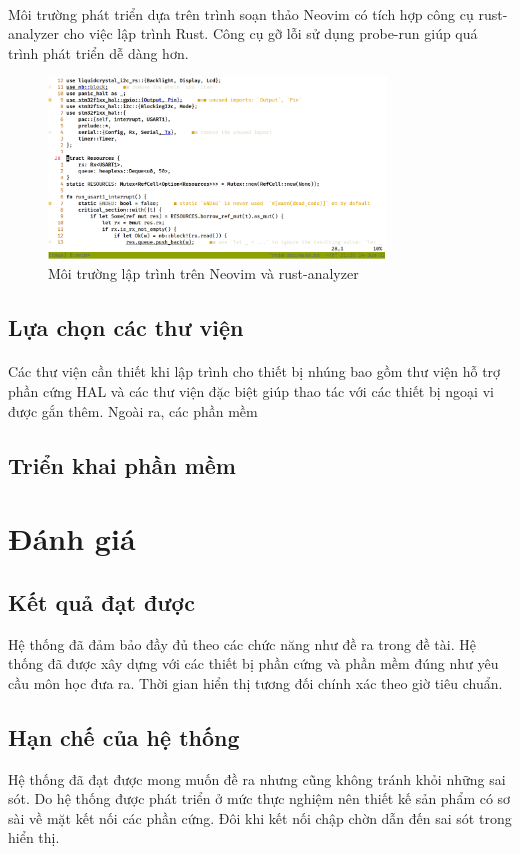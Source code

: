 \paragraph{}
Môi trường phát triển dựa trên trình soạn thảo Neovim có tích hợp công cụ rust-analyzer cho việc lập trình Rust. Công cụ gỡ lỗi sử dụng probe-run giúp quá trình phát triển dễ dàng hơn.
\begin{figure}[H]
    \centering
    \includegraphics[width=0.8\textwidth]{images/Screenshot from 2023-06-14 21-28-38.png}
    \caption{Môi trường lập trình trên Neovim và rust-analyzer}
    \label{fig:neovim-environment}
\end{figure}


\subsection{Lựa chọn các thư viện}
\paragraph{}
Các thư viện cần thiết khi lập trình cho thiết bị nhúng bao gồm thư viện hỗ trợ phần cứng HAL và các thư viện đặc biệt giúp thao tác với các thiết bị ngoại vi được gắn thêm. Ngoài ra, các phần mềm 
\subsection{Triển khai phần mềm}

\section{Đánh giá}

\subsection{Kết quả đạt được}
Hệ thống đã đảm bảo đầy đủ theo các chức năng như đề ra trong đề tài. Hệ thống đã được xây dựng với các thiết bị phần cứng và phần mềm đúng như yêu cầu môn học đưa ra.
Thời gian hiển thị tương đối chính xác theo giờ tiêu chuẩn.

\subsection{Hạn chế của hệ thống}
Hệ thống đã đạt được mong muốn đề ra nhưng cũng không tránh khỏi những sai sót. Do hệ thống được phát triển ở mức thực nghiệm nên thiết kế sản phẩm có sơ sài về mặt kết nối các phần cứng. Đôi khi kết nối chập chờn dẫn đến sai sót trong hiển thị.
